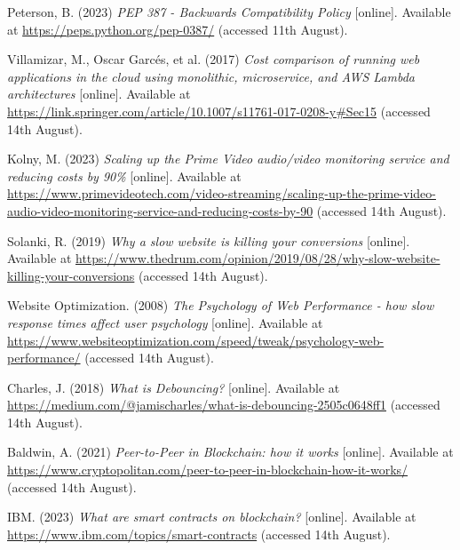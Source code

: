  \noindent [17] Peterson, B. (2023) \textit{PEP 387 - Backwards Compatibility Policy} [online]. Available at \url{https://peps.python.org/pep-0387/} (accessed 11th August).
 \vspace{0.2cm}

 \noindent [18] Villamizar, M., Oscar Garcés, et al. (2017) \textit{Cost comparison of running web applications in the cloud using monolithic, microservice, and AWS Lambda architectures} [online]. Available at \url{https://link.springer.com/article/10.1007/s11761-017-0208-y#Sec15} (accessed 14th August).
 \vspace{0.2cm}

 \noindent [19] Kolny, M. (2023) \textit{Scaling up the Prime Video audio/video monitoring service and reducing costs by 90\%} [online]. Available at \url{https://www.primevideotech.com/video-streaming/scaling-up-the-prime-video-audio-video-monitoring-service-and-reducing-costs-by-90} (accessed 14th August).
 \vspace{0.2cm}

 \noindent [20] Solanki, R. (2019) \textit{Why a slow website is killing your conversions} [online]. Available at \url{https://www.thedrum.com/opinion/2019/08/28/why-slow-website-killing-your-conversions} (accessed 14th August).
 \vspace{0.2cm}

 \noindent [21] Website Optimization. (2008) \textit{The Psychology of Web Performance - how slow response times affect user psychology} [online]. Available at \url{https://www.websiteoptimization.com/speed/tweak/psychology-web-performance/} (accessed 14th August).
 \vspace{0.2cm}

 \noindent [22] Charles, J. (2018) \textit{What is Debouncing?} [online]. Available at \url{https://medium.com/@jamischarles/what-is-debouncing-2505c0648ff1} (accessed 14th August).
 \vspace{0.2cm}

 \noindent [23] Baldwin, A. (2021) \textit{Peer-to-Peer in Blockchain: how it works} [online]. Available at \url{https://www.cryptopolitan.com/peer-to-peer-in-blockchain-how-it-works/} (accessed 14th August).
 \vspace{0.2cm}

 \noindent [24] IBM. (2023) \textit{What are smart contracts on blockchain?} [online]. Available at \url{https://www.ibm.com/topics/smart-contracts} (accessed 14th August).
 \vspace{0.2cm}

